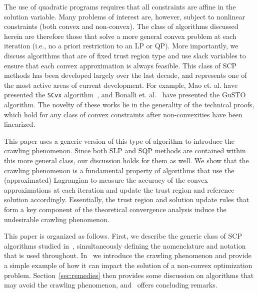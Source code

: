 \documentclass[letterpaper, 10 pt, conference]{ieeeconf}
\begin{document}
The use of quadratic programs requires that all constraints are affine in the solution variable. Many problems of interest are, however, subject to nonlinear constraints (both convex and non-convex). The class of algorithms discussed herein are therefore those that solve a more general convex problem at each iteration (i.e., no a priori restriction to an LP or QP). More importantly, we discuss algorithms that are of fixed trust region type and use slack variables to ensure that each convex approximation is always feasible. This class of SCP methods has been developed largely over the last decade, and represents one of the most active areas of current development. For example, Mao et. al. have presented the \texttt{SCvx} algorithm~\cite{Mao2016a,Mao2018}, and Bonalli et. al.~\cite{Bonalli2019,Bonalli2019b} have presented the GuSTO algorithm. The novelty of these works lie in the generality of the technical proofs, which hold for any class of convex constraints after non-convexities have been linearized. 

This paper uses a generic version of this type of algorithm to introduce the crawling phenomenon. Since both SLP and SQP methods are contained within this more general class, our discussion holds for them as well. We show that the crawling phenomenon is a fundamental property of algorithms that use the (approximated) Lagrangian to measure the accuracy of the convex approximations at each iteration and update the trust region and reference solution accordingly. Essentially, the trust region and solution update rules that form a key component of the theoretical convergence analysis induce the undesirable crawling phenomenon.    


This paper is organized as follows. First, we describe the generic class of SCP algorithms studied in~, simultaneously defining the nomenclature and notation that is used throughout. In~ we introduce the crawling phenomenon and provide a simple example of how it can impact the solution of a non-convex optimization problem. Section~\ref{sec:remedies} then provides some discussion on algorithms that may avoid the crawling phenomenon, and~ offers concluding remarks.
\end{document}
